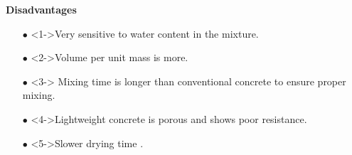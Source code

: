 \documentclass[aspectratio=169]{beamer}
\begin{document}
  \begin{frame}{\textbf{Disadvantages }}
      \begin{itemize}
          \large\item[$\bullet$] <1->Very sensitive to water content in the mixture.
           \vspace{0.5cm}
          \large\item[$\bullet$]<2->Volume per unit mass is more.
           \vspace{0.5cm}
          \large\item[$\bullet$] <3-> Mixing time is longer than conventional concrete to ensure proper
mixing.
         \vspace{0.5cm}
         \item[$\bullet$]<4->Lightweight concrete is porous and shows poor resistance.
         \vspace{0.5cm}
         \item[$\bullet$]<5->Slower drying time \cite{sherin2018review}.
          \end{itemize}
  \end{frame}
\end{document}
